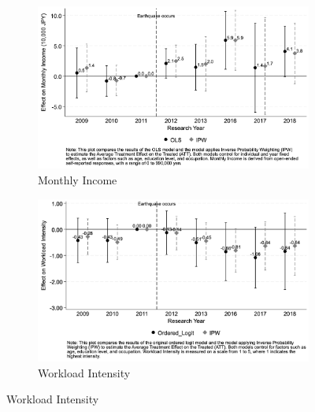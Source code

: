 \documentclass[a4paper,12pt]{article}
\begin{document}
\begin{figure}[htbp]

    \begin{center}
    \begin{subfigure}{0.8\linewidth}
        \caption{Monthly Income}
        \label{fig:monthly_income}    
        \centering\includegraphics[width=\linewidth]{monthly_income_comparison.png}
    \end{subfigure}


    \begin{subfigure}{0.8\linewidth}
        \caption{Workload Intensity}
        \label{fig:weekly_work_hours}            
        \centering\includegraphics[width=\linewidth]{workload_intensity_comparison.png}
    \end{subfigure}



\end{center}
\end{figure}
\end{document}
